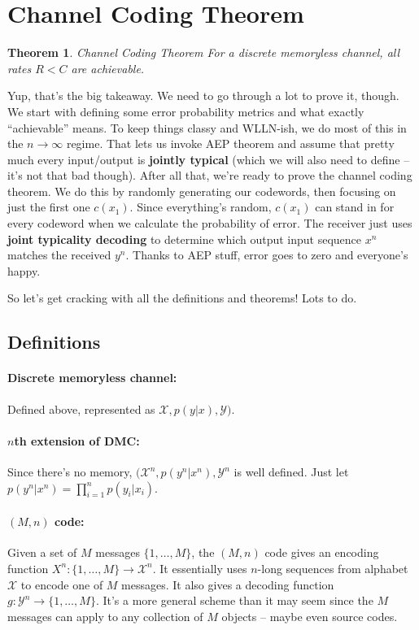 \documentclass[a4paper,12pt]{report}
\newtheorem{theorem}{Theorem}
\begin{document}
\section{Channel Coding Theorem}

\begin{theorem}{Channel Coding Theorem}
For a discrete memoryless channel, all rates $R < C$ are achievable.
\end{theorem}

Yup, that's the big takeaway. We need to go through a lot to prove it, though.
We start with defining some error probability metrics and what exactly
``achievable'' means. To keep things classy and WLLN-ish, we do most of this in
the $n\to \infty$ regime. That lets us invoke AEP theorem and assume that pretty
much every input/output is \textbf{jointly typical} (which we will also need to
define -- it's not that bad though). After all that, we're ready to prove the
channel coding theorem. We do this by randomly generating our codewords, then
focusing on just the first one $c(x_1)$. Since everything's random, $c(x_1)$ can
stand in for every codeword when we calculate the probability of error. The
receiver just uses \textbf{joint typicality decoding} to determine which output
input sequence $x^n$ matches the received $y^n$. Thanks to AEP stuff, error goes
to zero and everyone's happy.

So let's get cracking with all the definitions and theorems! Lots to do.






\subsection{Definitions}

\paragraph{Discrete memoryless channel: } Defined above, represented as
$\mathcal X, p(y | x), \mathcal Y)$.

\paragraph{$n$th extension of DMC: } Since there's no memory, $(\mathcal X^n,
p(y^n | x^n), \mathcal Y^n$ is well defined. Just let $p(y^n | x^n) =
\prod_{i=1}^n p(y_i | x_i)$.

\paragraph{$(M, n)$ code: } Given a set of $M$ messages $\{1, \dots, M\}$, the
$(M, n)$ code gives an encoding function $X^n: \{1, \dots, M\} \to \mathcal
X^n$. It essentially uses $n$-long sequences from alphabet $\mathcal X$ to
encode one of $M$ messages. It also gives a decoding function $g: \mathcal Y^n
\to \{1, \dots, M\}$. It's a more general scheme than it may seem since the $M$
messages can apply to any collection of $M$ objects -- maybe even source codes. 
\end{document}
